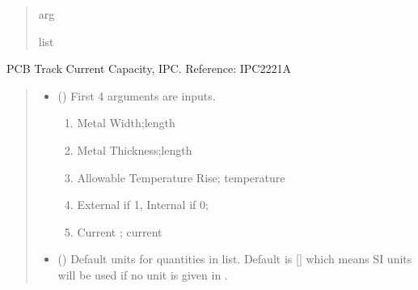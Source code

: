 \documentclass[letterpaper,10pt,english]{sphinxmanual}
\begin{document}
\begin{fulllineitems}
\begin{quote}
\begin{description}
\begin{itemize}
\end{itemize}

\sphinxAtStartPar
arg

\sphinxAtStartPar
list

\end{description}\end{quote}

\end{fulllineitems}


\begin{fulllineitems}
\label{\detokenize{components:components.PCBTrackCurrentCapacityIPC}}
\pysigstartsignatures
{}
\pysigstopsignatures
\sphinxAtStartPar
PCB Track Current Capacity, IPC.
Reference: IPC2221A
\begin{quote}\begin{description}
\begin{itemize}
\item {} 
\sphinxAtStartPar
{} () \textendash{} 
\sphinxAtStartPar
First 4 arguments are inputs.
\begin{enumerate}
%
\item {} 
\sphinxAtStartPar
Metal Width;length

\item {} 
\sphinxAtStartPar
Metal Thickness;length

\item {} 
\sphinxAtStartPar
Allowable Temperature Rise; temperature

\item {} 
\sphinxAtStartPar
External if 1, Internal if 0;

\item {} 
\sphinxAtStartPar
Current ; current

\end{enumerate}


\item {} 
\sphinxAtStartPar
{} (\sphinxstyleliteralemphasis{\sphinxupquote{, }}) \textendash{} Default units for quantities in  list. Default is {[}{]} which means SI units will be used if no unit is given in .


\end{itemize}
\end{description}
\end{quote}
\end{fulllineitems}
\end{document}
